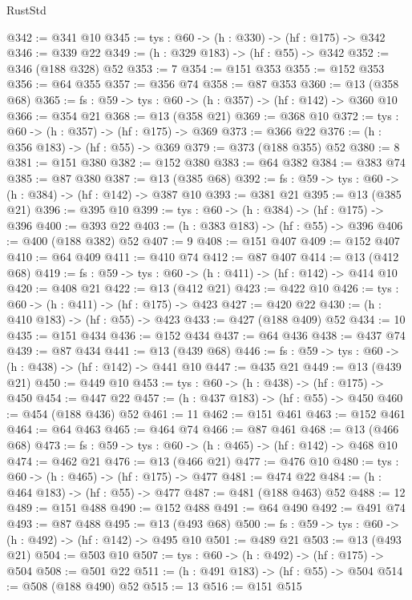 \begin{lexlean}{RustStd}
\begin{coremodule}
@342 := @341 @10
@345 := {tys : @60} -> (h : @330) -> (hf : @175) -> @342
@346 := @339 @22
@349 := (h : @329 @183) -> (hf : @55) -> @342
@352 := @346 (@188 @328) @52
@353 := 7
@354 := @151 @353
@355 := @152 @353
@356 := @64 @355
@357 := @356 @74
@358 := @87 @353
@360 := @13 (@358 @68)
@365 := {fs : @59} -> {tys : @60} -> (h : @357) -> (hf : @142) -> @360 @10
@366 := @354 @21
@368 := @13 (@358 @21)
@369 := @368 @10
@372 := {tys : @60} -> (h : @357) -> (hf : @175) -> @369
@373 := @366 @22
@376 := (h : @356 @183) -> (hf : @55) -> @369
@379 := @373 (@188 @355) @52
@380 := 8
@381 := @151 @380
@382 := @152 @380
@383 := @64 @382
@384 := @383 @74
@385 := @87 @380
@387 := @13 (@385 @68)
@392 := {fs : @59} -> {tys : @60} -> (h : @384) -> (hf : @142) -> @387 @10
@393 := @381 @21
@395 := @13 (@385 @21)
@396 := @395 @10
@399 := {tys : @60} -> (h : @384) -> (hf : @175) -> @396
@400 := @393 @22
@403 := (h : @383 @183) -> (hf : @55) -> @396
@406 := @400 (@188 @382) @52
@407 := 9
@408 := @151 @407
@409 := @152 @407
@410 := @64 @409
@411 := @410 @74
@412 := @87 @407
@414 := @13 (@412 @68)
@419 := {fs : @59} -> {tys : @60} -> (h : @411) -> (hf : @142) -> @414 @10
@420 := @408 @21
@422 := @13 (@412 @21)
@423 := @422 @10
@426 := {tys : @60} -> (h : @411) -> (hf : @175) -> @423
@427 := @420 @22
@430 := (h : @410 @183) -> (hf : @55) -> @423
@433 := @427 (@188 @409) @52
@434 := 10
@435 := @151 @434
@436 := @152 @434
@437 := @64 @436
@438 := @437 @74
@439 := @87 @434
@441 := @13 (@439 @68)
@446 := {fs : @59} -> {tys : @60} -> (h : @438) -> (hf : @142) -> @441 @10
@447 := @435 @21
@449 := @13 (@439 @21)
@450 := @449 @10
@453 := {tys : @60} -> (h : @438) -> (hf : @175) -> @450
@454 := @447 @22
@457 := (h : @437 @183) -> (hf : @55) -> @450
@460 := @454 (@188 @436) @52
@461 := 11
@462 := @151 @461
@463 := @152 @461
@464 := @64 @463
@465 := @464 @74
@466 := @87 @461
@468 := @13 (@466 @68)
@473 := {fs : @59} -> {tys : @60} -> (h : @465) -> (hf : @142) -> @468 @10
@474 := @462 @21
@476 := @13 (@466 @21)
@477 := @476 @10
@480 := {tys : @60} -> (h : @465) -> (hf : @175) -> @477
@481 := @474 @22
@484 := (h : @464 @183) -> (hf : @55) -> @477
@487 := @481 (@188 @463) @52
@488 := 12
@489 := @151 @488
@490 := @152 @488
@491 := @64 @490
@492 := @491 @74
@493 := @87 @488
@495 := @13 (@493 @68)
@500 := {fs : @59} -> {tys : @60} -> (h : @492) -> (hf : @142) -> @495 @10
@501 := @489 @21
@503 := @13 (@493 @21)
@504 := @503 @10
@507 := {tys : @60} -> (h : @492) -> (hf : @175) -> @504
@508 := @501 @22
@511 := (h : @491 @183) -> (hf : @55) -> @504
@514 := @508 (@188 @490) @52
@515 := 13
@516 := @151 @515

\end{coremodule}
\end{lexlean}
